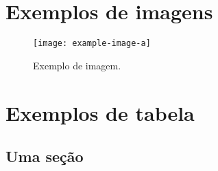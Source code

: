 \documentclass[
	12pt,				%
	openright,			%
	twoside,			%
	a4paper,			%
	english,			%
	french,				%
	brazil,				%
	sumario=tradicional
]{abntex2}
\begin{document}
\chapter{Exemplos de imagens}

\lipsum[1]

\begin{figure}
\centering
\texttt{[image: example-image-a]}
\caption{Exemplo de imagem.}
\label{fig:exemplo}
\end{figure}

\lipsum[6]





\lipsum[7]

\chapter{Exemplos de tabela}

\section{Uma seção}

\lipsum[8]
\end{document}
